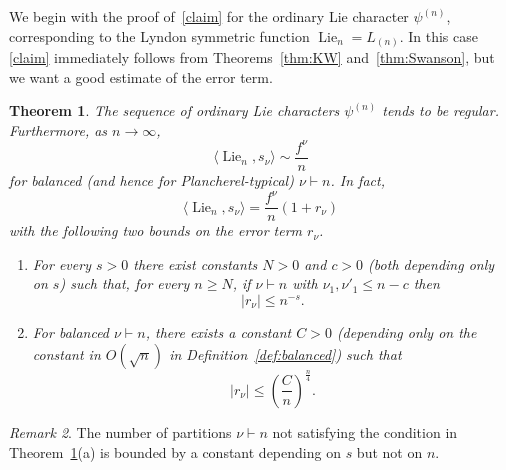 \documentclass[12pt]%
{amsart}
\newcommand{\Lie}{\operatorname{Lie}}
\theoremstyle{plain}
\newtheorem{theorem}{Theorem}[section]
\theoremstyle{definition}
\theoremstyle{remark}
\newtheorem{remark}[theorem]{Remark}
\newcommand{\todo}[1]{\vspace{5 mm}\par \noindent
	\marginpar{\textsc{ToDo}} \framebox{\begin{minipage}[c]{0.95
				\textwidth}
			#1 \end{minipage}}\vspace{5 mm}\par}
\begin{document}
We begin with the proof of~\eqref{claim} for 
the ordinary Lie character 
$\psi^{(n)}$,
corresponding to the Lyndon symmetric function $\Lie_n = L_{(n)}$. 
In this case \eqref{claim} immediately 
follows from Theorems~\ref{thm:KW} and~\ref{thm:Swanson},  
but %
we want a good estimate of the error term.


\begin{theorem}\label{prop:Lie}
    The sequence of 
    ordinary Lie characters $\psi^{(n)}$ 
    tends to be regular. 
    Furthermore, as $n \to \infty$,
    \[
        \langle \Lie_n,s_\nu \rangle
        \sim \frac{f^\nu}{n} 
    \]
    for balanced (and hence for Plancherel-typical) $\nu \vdash n$. 
    In fact,
    \[
        \langle \Lie_n,s_\nu \rangle
        = \frac{f^\nu}n(1+r_\nu)
    \]
    with the following two bounds on the error term $r_\nu$.
    \begin{enumerate}
    \item[\rm(a)] 
        For every $s > 0$ there exist constants $N > 0$ and $c > 0$ (both depending only on $s$) such that, for every $n \ge N$, if $\nu \vdash n$ with $\nu_1, \nu'_1 \le n-c$ then 
        \begin{equation}\label{swanson}
            |r_\nu| \le n^{-s}.
        \end{equation}
    
    \item[\rm(b)] 
        For balanced $\nu\vdash n$, there exists a constant $C>0$ (depending only on the constant in $O(\sqrt n)$ in Definition~\ref{def:balanced}) such that
        \begin{equation}
            |r_\nu| 
            \le \left(\frac{C}{n}\right)^\frac{n}{4}.
        \end{equation}
    
    \end{enumerate}
\end{theorem}

\begin{remark}
    The number of partitions $\nu \vdash n$ not satisfying the condition in Theorem~\ref{prop:Lie}(a) is bounded by a constant depending on $s$ but not on $n$.    
\end{remark}
\end{document}
